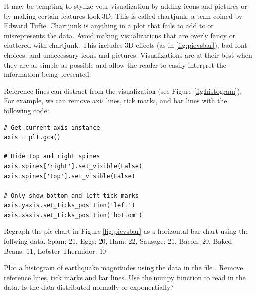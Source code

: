 It may be tempting to stylize your visualization by adding icons and pictures or by making certain features
look 3D.  This is called chartjunk, a term coined by Edward Tufte. Chartjunk is anything in a plot that fails to add to or
misrepresents the data.  Avoid making visualizations that are overly fancy or cluttered with chartjunk. This
includes 3D effects (as in \ref{fig:pievsbar}), bad font choices, and unnecessary icons and pictures.
Visualizations are at their best when they are as simple as possible and allow the reader to easily
interpret the information being presented.

Reference lines can distract from the visualization (see Figure \ref{fig:histogram}).
For example, we can remove axis lines, tick marks, and bar lines
with the following code:

\begin{lstlisting}
# Get current axis instance
axis = plt.gca()

# Hide top and right spines
axis.spines['right'].set_visible(False)
axis.spines['top'].set_visible(False)

# Only show bottom and left tick marks
axis.yaxis.set_ticks_position('left')
axis.xaxis.set_ticks_position('bottom')
\end{lstlisting}

\begin{problem} %
Regraph the pie chart in Figure \ref{fig:pievsbar} as a horizontal bar chart using the follwing data.
Spam: 21, Eggs: 20, Ham: 22, Sausage: 21, Bacon: 20, Baked Beans: 11, Lobster Thermidor: 10
\end{problem}

\begin{problem} %
Plot a histogram of earthquake magnitudes using the data in the file .
Remove reference lines, tick marks and bar lines.
Use the numpy function  to read in the data.
Is the data distributed normally or exponentially?
\end{problem}

